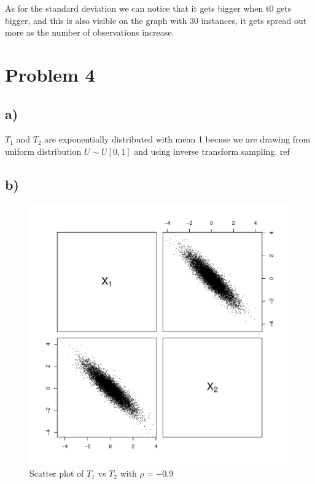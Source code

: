 \documentclass[a4paper, 11pt]{article}
\begin{document}
As for the standard deviation we can notice that it gets bigger when t0 gets bigger, and this is also visible on the graph with 30 instances, it gets spread out more as the number of observations increase.


\section*{Problem 4}

\subsection*{a)}
$T_1$  and $T_2$ are exponentially distributed with mean 1 becuse we are drawing from uniform distribution $U\sim U[0,1]$ and using inverse transform sampling.
ref \cite{referencja}
\subsection*{b)}

\begin{figure}[H]
  \centering
  \includegraphics[scale=0.5,page=2]{Rplots4.pdf}
  \caption{Scatter plot of $T_1$ vs $T_2$ with $\rho = -0.9$}
  \label{t1t2neg}
\end{figure}
\end{document}
